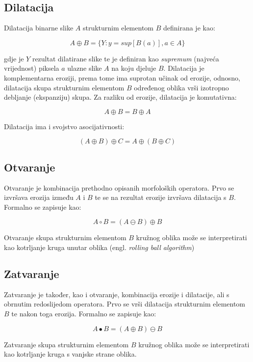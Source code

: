 \documentclass[times, zavrsni, numeric, utf8]{fer}
\begin{document}
\subsection{Dilatacija}
\hspace*{0.5cm}Dilatacija binarne slike $A$ strukturnim elementom $B$ definirana je kao:
\begin{center}
\begin{equation}
A \oplus B = \{Y:y = sup[B(a)], a \in A\}
\end{equation}
\end{center}
gdje je $Y$ rezultat dilatirane slike te je definiran kao \textit{supremum} (najveća vrijednost) piksela $a$ ulazne slike $A$ na koju djeluje $B$.
Dilatacija je komplementarna eroziji, prema tome ima suprotan učinak od erozije, odnosno, dilatacija skupa strukturnim elementom $B$ određenog oblika vrši izotropno debljanje (ekspanziju) skupa. Za razliku od erozije, dilatacija je komutativna:
\begin{center}
\begin{equation}
A \oplus B = B \oplus A
\end{equation}
\end{center}
Dilatacija ima i svojstvo asocijativnosti:
\begin{center}
\begin{equation}
(A \oplus B) \oplus C = A \oplus (B \oplus C)
\end{equation}
\end{center}

\subsection{Otvaranje}
\hspace*{0.5cm}Otvaranje je kombinacija prethodno opisanih morfoloških operatora. Prvo se izvršava erozija između $A$ i $B$ te se na rezultat erozije izvršava dilatacija s $B$. Formalno se zapisuje kao:
\begin{center}
\begin{equation}
A \circ B = (A \ominus B) \oplus B
\end{equation}
\end{center}
Otvaranje skupa strukturnim elementom $B$ kružnog oblika može se interpretirati kao kotrljanje kruga unutar oblika (engl. \textit{rolling ball algorithm}) 
\subsection{Zatvaranje}
\hspace*{0.5cm}Zatvaranje je također, kao i otvaranje, kombinacija erozije i dilatacije, ali s obrnutim redoslijedom operatora. Prvo se vrši dilatacija strukturnim elementom $B$ te nakon toga erozija. Formalno se zapisuje kao:
\begin{center}
\begin{equation}
A \bullet B = (A \oplus B) \ominus B
\end{equation}
\end{center}
Zatvaranje skupa strukturnim elementom $B$ kružnog oblika može se interpretirati kao kotrljanje kruga s vanjske strane oblika.
\end{document}

